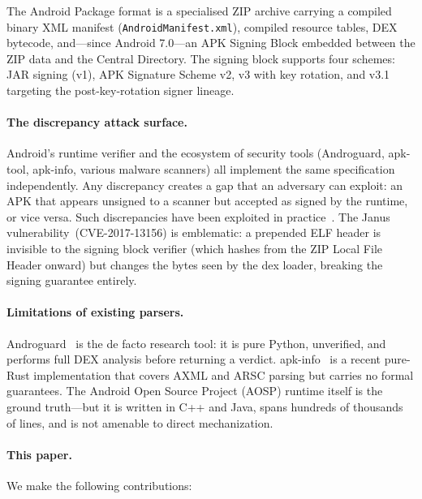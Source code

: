 \documentclass[runningheads]{llncs}
\begin{document}
The Android Package format is a specialised ZIP archive carrying a compiled
binary XML manifest (\texttt{AndroidManifest.xml}), compiled resource tables,
DEX bytecode, and—since Android 7.0—an APK Signing Block embedded between the
ZIP data and the Central Directory.  The signing block supports four schemes:
JAR signing (v1), APK Signature Scheme v2, v3 with key rotation, and v3.1
targeting the post-key-rotation signer lineage.

\paragraph{The discrepancy attack surface.}
Android's runtime verifier and the ecosystem of security tools (Androguard,
apk-tool, apk-info, various malware scanners) all implement the same
specification independently.  Any discrepancy creates a gap that an adversary
can exploit: an APK that appears unsigned to a scanner but accepted as signed
by the runtime, or vice versa.  Such discrepancies have been exploited in
practice~\cite{janus2017,masterkey2013,apksign2019}.  The Janus
vulnerability~(CVE-2017-13156) is emblematic: a prepended ELF header is
invisible to the signing block verifier (which hashes from the ZIP Local File
Header onward) but changes the bytes seen by the dex loader, breaking
the signing guarantee entirely.

\paragraph{Limitations of existing parsers.}
Androguard~\cite{androguard} is the de facto research tool: it is pure Python,
unverified, and performs full DEX analysis before returning a verdict.
apk-info~\cite{apkinfo} is a recent pure-Rust implementation that covers AXML
and ARSC parsing but carries no formal guarantees.
The Android Open Source Project (AOSP) runtime itself is the ground truth—but
it is written in C++ and Java, spans hundreds of thousands of lines, and is
not amenable to direct mechanization.

\paragraph{This paper.}
We make the following contributions:
\end{document}
